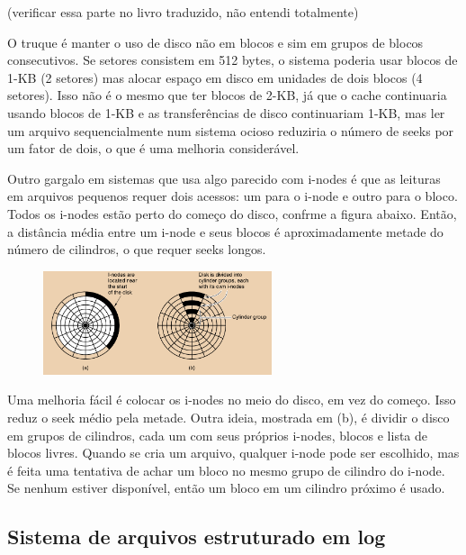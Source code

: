\documentclass{article}
\begin{document}
(verificar essa parte no livro traduzido, não entendi totalmente)

O truque é manter o uso de disco não em blocos e sim em grupos de blocos consecutivos. Se setores consistem em 512 bytes, o sistema poderia usar blocos de 1-KB (2 setores) mas alocar espaço em disco em unidades de dois blocos (4 setores). Isso não é o mesmo que ter blocos de 2-KB, já que o cache continuaria usando blocos de 1-KB e as transferências de disco continuariam 1-KB, mas ler um arquivo sequencialmente num sistema ocioso reduziria o número de seeks por um fator de dois, o que é uma melhoria considerável.

Outro gargalo em sistemas que usa algo parecido com i-nodes é que as leituras em arquivos pequenos requer dois acessos: um para o i-node e outro para o bloco. Todos os i-nodes estão perto do começo do disco, confrme a figura abaixo. Então, a distância média entre um i-node e seus blocos é aproximadamente metade do número de cilindros, o que requer seeks longos.

\begin{figure}[h]
  \begin{center}
    \includegraphics[width=0.6\textwidth]{img/5-21.png}
  \end{center}
  \caption{}
  \label{fig:}
\end{figure}

Uma melhoria fácil é colocar os i-nodes no meio do disco, em vez do começo. Isso reduz o seek médio pela metade. Outra ideia, mostrada em (b), é dividir o disco em grupos de cilindros, cada um com seus próprios i-nodes, blocos e lista de blocos livres. Quando se cria um arquivo, qualquer i-node pode ser escolhido, mas é feita uma tentativa de achar um bloco no mesmo grupo de cilindro do i-node. Se nenhum estiver disponível, então um bloco em um cilindro próximo é usado.

\newpage

\subsection{Sistema de arquivos estruturado em log}
\end{document}
